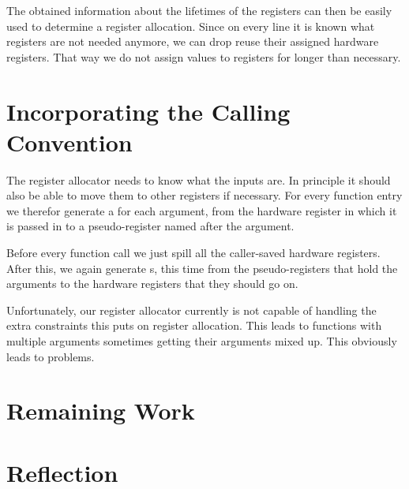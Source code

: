 The obtained information about the lifetimes of the registers can then be easily used to determine a register allocation.
Since on every line it is known what registers are not needed anymore, we can drop reuse their assigned hardware registers.
That way we do not assign values to registers for longer than necessary.

\section{Incorporating the Calling Convention}

The register allocator needs to know what the inputs are.
In principle it should also be able to move them to other registers if necessary.
For every function entry we therefor generate a  for each argument, from the hardware register in which it is passed in to a pseudo-register named after the argument.

Before every function call we just spill all the caller-saved hardware registers.
After this, we again generate s, this time from the pseudo-registers that hold the arguments to the hardware registers that they should go on.

Unfortunately, our register allocator currently is not capable of handling the extra constraints this puts on register allocation.
This leads to functions with multiple arguments sometimes getting their arguments mixed up.
This obviously leads to problems.


\section{Remaining Work}

\section{Reflection}

